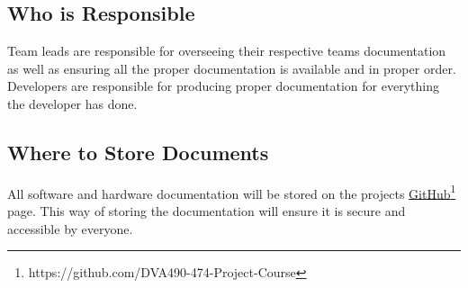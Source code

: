 

\subsection{Who is Responsible}

Team leads are responsible for overseeing their respective teams documentation as well as ensuring all the proper documentation is available and in proper order. Developers are responsible for producing proper documentation for everything the developer has done.

\subsection{Where to Store Documents}

All software and hardware documentation will be stored on the projects \href{https://github.com/DVA490-474-Project-Course}{GitHub}\footnote{https://github.com/DVA490-474-Project-Course} page. This way of storing the documentation will ensure it is secure and accessible by everyone.

